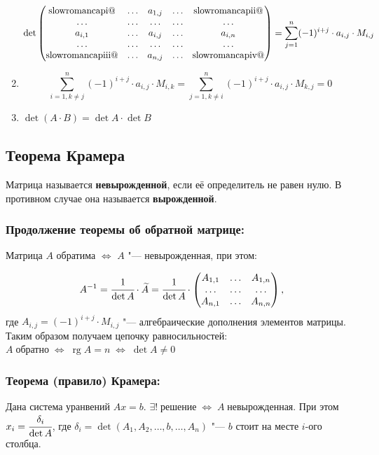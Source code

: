\documentclass{article}
\makeatletter
\newcommand*{\rom}[1]{\expandafter\@slowromancap\romannumeral #1@}
\makeatother
\begin{document}
\begin{enumerate}
	\begin{equation*}\operatorname{det}
	\begin{pmatrix}
	\text{\rom{1}} & \ldots & a_{1, j} & \ldots &\text{\rom{2}}\\
	\ldots & \ldots & \ldots & \ldots & \ldots\\
	a_{i, 1} & \ldots & a_{i, j} & \ldots & a_{i, n}\\
	\ldots & \ldots&\ldots &\ldots & \ldots\\
	\text{\rom{3}} & \ldots & a_{n, j} & \ldots & \text{\rom{4}}
	\end{pmatrix} = \sum_{j = 1}^{n} (-1)^{i + j} \cdot a_{i, j} \cdot M_{i, j}
	\end{equation*}
	\item $$\sum_{i = 1, k \neq j}^{n}(-1)^{i+j}\cdot a_{i, j} \cdot M_{i, k} = \sum_{j = 1, k \neq i}^{n} (-1)^{i + j} \cdot a_{i, j} \cdot M_{k, j} = 0$$
	\item $\operatorname{det}(A\cdot B) = \operatorname{det}A \cdot \operatorname{det}B$
\end{enumerate}

\subsection{Теорема Крамера}

Матрица называется \textbf{невырожденной}, если её определитель не равен нулю. В противном случае она называется \textbf{вырожденной}.

\subsubsection{Продолжение теоремы об обратной матрице:}
 Матрица $A$ обратима $\Leftrightarrow$ $A$ "--- невырожденная, при этом:
 
\begin{equation*}A^{-1} = \cfrac{1}{\operatorname{det}A} \cdot \widetilde{A} = \cfrac{1}{\operatorname{det}A} \cdot
\begin{pmatrix}
A_{1, 1} & \ldots & A_{1, n}\\
\ldots & \ldots & \ldots\\
A_{n, 1} & \ldots & A_{n, n}
\end{pmatrix}\text{,}
\end{equation*} где $A_{i, j} = (-1)^{i + j} \cdot M_{i, j}$ "--- алгебраические дополнения элементов матрицы.
Таким образом получаем цепочку равносильностей:
$A \; \text{обратно} \;\Leftrightarrow\; \operatorname{rg}A = n\;\Leftrightarrow\; \operatorname{det}A \neq 0$

\subsubsection{Теорема (правило) Крамера:}
Дана система уранвений $Ax = b$. 
$\exists ! \;\text{решение} \;\Leftrightarrow\; A\;\text{невырожденная}$.
При  этом $x_i = \cfrac{\delta_i}{\operatorname{det}A}$, где $\delta_i = \operatorname{det}(A_1, A_2, \ldots, b, \ldots, A_n)$ "--- $b$ стоит на месте $i$-ого столбца.
 
\end{document}
